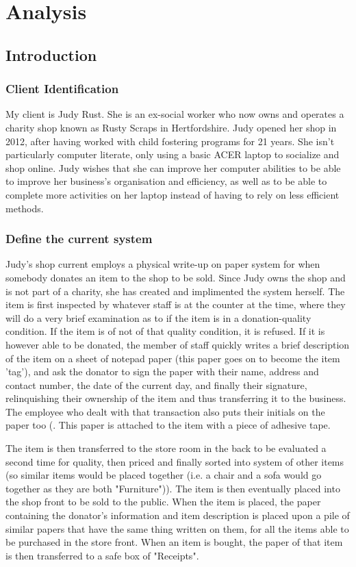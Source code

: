 \chapter{Analysis}

\section{Introduction}

\subsection{Client Identification}
My client is Judy Rust. She is an ex-social worker who now owns and operates a charity shop known as Rusty Scraps in Hertfordshire. Judy opened her shop in 2012, after having worked with child fostering programs for 21 years. She isn't particularly computer literate, only using a basic ACER laptop to socialize and shop online. Judy wishes that she can improve her computer abilities to be able to improve her business's organisation and efficiency, as well as to be able to complete more activities on her laptop instead of having to rely on less efficient methods.
\subsection{Define the current system}
Judy's shop current employs a physical write-up on paper system for when somebody donates an item to the shop to be sold. Since Judy owns the shop and is not part of a charity, she has created and implimented the system herself. The item is first inspected by whatever staff is at the counter at the time, where they will do a very brief examination as to if the item is in a donation-quality condition. If the item is of not of that quality condition, it is refused. If it is however able to be donated, the member of staff quickly writes a brief description of the item on a sheet of notepad paper (this paper goes on to become the item 'tag'), and ask the donator to sign the paper with their name, address and contact number, the date of the current day, and finally their signature, relinquishing their ownership of the item and thus transferring it to the business. The employee who dealt with that transaction also puts their initials on the paper too (. This paper is attached to the item with a piece of adhesive tape.

 The item is then transferred to the store room in the back to be evaluated a second time for quality, then priced and finally sorted into system of other items (so similar items would be placed together (i.e. a chair and a sofa would go together as they are both "Furniture")). The item is then eventually placed into the shop front to be sold to the public. When the item is placed, the paper containing the donator's information and item description is placed upon a pile of similar papers that have the same thing written on them, for all the items able to be purchased in the store front. When an item is bought, the paper of that item is then transferred to a safe box of "Receipts".
